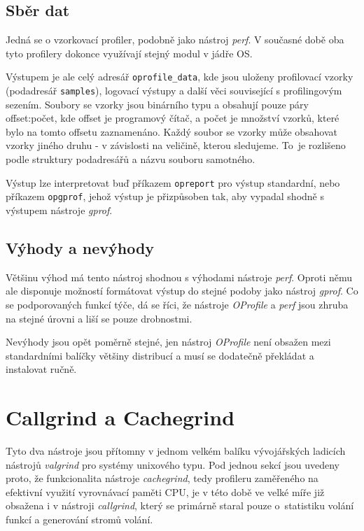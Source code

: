 \documentclass[czech,BP]{thesiskiv}
\begin{document}
\subsection*{Sběr dat}

Jedná se o vzorkovací profiler, podobně jako nástroj \emph{perf}. V současné době oba tyto profilery dokonce využívají stejný modul v jádře OS.

Výstupem je ale celý adresář \texttt{oprofile\_data}, kde jsou uloženy profilovací vzorky (podadresář \texttt{samples}), logovací výstupy a další věci související s profilingovým sezením. Soubory se vzorky jsou binárního typu a obsahují pouze páry offset:počet, kde offset je programový čítač, a počet je množství vzorků, které bylo na tomto offsetu zaznamenáno. Každý soubor se vzorky může obsahovat vzorky jiného druhu - v závislosti na veličině, kterou sledujeme. To~je rozlišeno podle struktury podadresářů a názvu souboru samotného.

Výstup lze interpretovat buď příkazem \texttt{opreport} pro výstup standardní, nebo příkazem \texttt{opgprof}, jehož výstup je přizpůsoben tak, aby vypadal shodně s výstupem nástroje \emph{gprof}.

\subsection*{Výhody a nevýhody}

Většinu výhod má tento nástroj shodnou s výhodami nástroje \emph{perf}. Oproti němu ale disponuje možností formátovat výstup do stejné podoby jako nástroj \emph{gprof}. Co se podporovaných funkcí týče, dá se říci, že nástroje \emph{OProfile} a \emph{perf} jsou zhruba na stejné úrovni a liší se pouze drobnostmi.

Nevýhody jsou opět poměrně stejné, jen nástroj \emph{OProfile} není obsažen mezi standardními balíčky většiny distribucí a musí se dodatečně překládat a instalovat ručně.




\section{Callgrind a Cachegrind}

Tyto dva nástroje jsou přítomny v jednom velkém balíku vývojářských ladicích nástrojů \emph{valgrind} pro systémy unixového typu. Pod jednou sekcí jsou uvedeny proto, že funkcionalita nástroje \emph{cachegrind}, tedy profileru zaměřeného na efektivní využití vyrovnávací paměti CPU, je v této době ve velké míře již obsažena i v nástroji \emph{callgrind}, který se primárně staral pouze o~statistiku volání funkcí a generování stromů volání.
\end{document}
